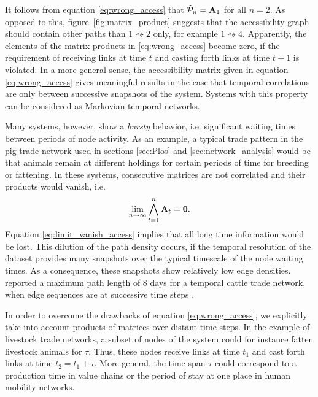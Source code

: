 It follows from equation \eqref{eq:wrong_access} that $\tilde{\mathcal{P}}_n =\mathbf{A}_1$ for all $n=2$. 
As opposed to this, figure~\ref{fig:matrix_product} suggests that the accessibility graph should contain other paths than $1\rightsquigarrow 2$ only, for example $1\rightsquigarrow 4$.
Apparently, the elements of the matrix products in \eqref{eq:wrong_access} become zero, if the requirement of receiving links at time $t$ and casting forth links at time $t+1$ is violated.
In a more general sense, the accessibility matrix given in equation \eqref{eq:wrong_access} gives meaningful results in the case that temporal correlations are only between successive snapshots of the system.
Systems with this property can be considered as Markovian temporal networks.

Many systems, however, show a \emph{bursty} behavior, i.e. significant waiting times between periods of node activity.
As an example, a typical trade pattern in the pig trade network used in sections \ref{sec:Plos} and \ref{sec:network_analysis} would be that animals remain at different holdings for certain periods of time for breeding or fattening. 
In these systems, consecutive matrices are not correlated and their products would vanish, i.e.
\begin{equation}\label{eq:limit_vanish_access}
\lim _{n\rightarrow \infty } \bigwedge _{t=1} ^n \mathbf{A}_t =\mathbf{0}.
\end{equation}
Equation \eqref{eq:limit_vanish_access} implies that all long time information would be lost.
This dilution of the path density occurs, if the temporal resolution of the dataset provides many snapshots over the typical timescale of the node waiting times.
As a consequence, these snapshots show relatively low edge densities.
\citeauthor{Bajardi:2011iv} reported a maximum path length of 8 days for a temporal cattle trade network, when edge sequences are at successive time steps \citep{Bajardi:2011iv}.

In order to overcome the drawbacks of equation \eqref{eq:wrong_access}, we explicitly take into account products of matrices over distant time steps.
In the example of livestock trade networks, a subset of nodes of the system could for instance fatten livestock animals for $\tau $.
Thus, these nodes receive links at time $t_1$ and cast forth links at time $t_2=t_1+\tau $.
More general, the time span $\tau $ could correspond to a production time in value chains or the period of stay at one place in human mobility networks.

